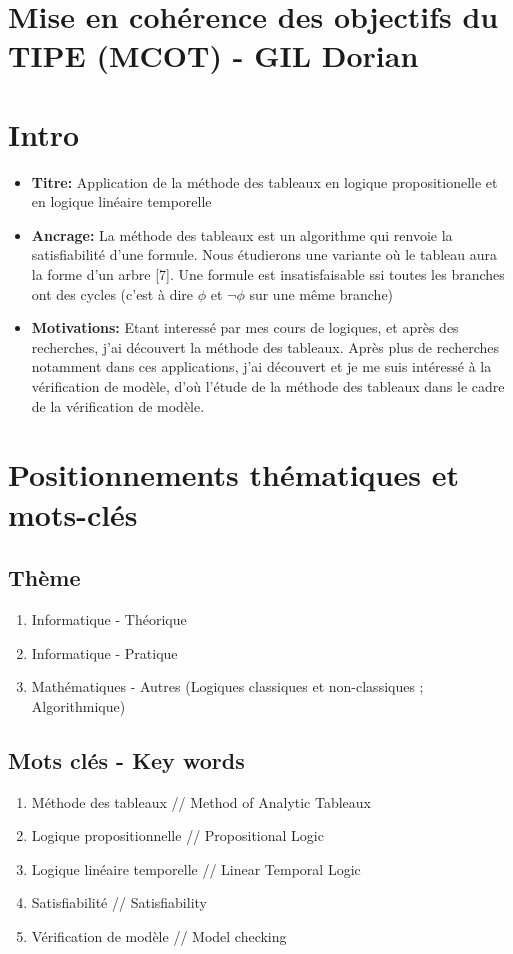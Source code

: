 \documentclass{paper}
\begin{document}
\section*{Mise en cohérence des objectifs du TIPE (MCOT) - GIL Dorian}

\section{Intro}
\begin{itemize}
    \item \textbf{Titre: }Application de la méthode des tableaux en logique propositionelle et en logique linéaire temporelle
    \item \textbf{Ancrage: }La méthode des tableaux est un algorithme qui renvoie la satisfiabilité d'une formule. Nous étudierons une variante où le tableau aura la forme d'un arbre [7]. Une formule est insatisfaisable ssi toutes les branches ont des cycles (c'est à dire $\phi$ et $\lnot\phi$ sur une même branche)
    \item \textbf{Motivations: }Etant interessé par mes cours de logiques, et après des recherches, j'ai découvert la méthode des tableaux. Après plus de recherches notamment dans ces applications, j'ai découvert et je me suis intéressé à la vérification de modèle, d'où l'étude de la méthode des tableaux dans le cadre de la vérification de modèle.
\end{itemize}

\section{Positionnements thématiques et mots-clés}
\subsection{Thème}
\begin{enumerate}
\item Informatique - Théorique
\item Informatique - Pratique
\item Mathématiques - Autres (Logiques classiques et non-classiques ; Algorithmique)
\end{enumerate}

\subsection{Mots clés - Key words}
\begin{enumerate}
\item Méthode des tableaux // Method of Analytic Tableaux
\item Logique propositionnelle // Propositional Logic
\item Logique linéaire temporelle // Linear Temporal Logic
\item Satisfiabilité // Satisfiability
\item Vérification de modèle // Model checking
\end{enumerate}
\end{document}

